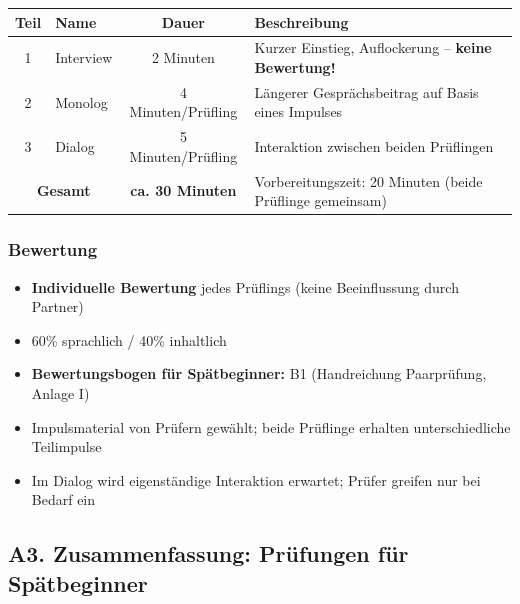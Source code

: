\documentclass[10pt,a4paper]{article}
\begin{document}
\begin{center}
\small
\begin{tabular}{|c|p{3.5cm}|c|p{6cm}|}
\hline
\rowcolor{lightgray}
\textbf{Teil} & \textbf{Name} & \textbf{Dauer} & \textbf{Beschreibung} \\
\hline
1 & Interview & 2 Minuten & Kurzer Einstieg, Auflockerung -- \textbf{keine Bewertung!} \\
\hline
2 & Monolog & 4 Minuten/Prüfling & Längerer Gesprächsbeitrag auf Basis eines Impulses \\
\hline
3 & Dialog & 5 Minuten/Prüfling & Interaktion zwischen beiden Prüflingen \\
\hline
\multicolumn{2}{|c|}{\textbf{Gesamt}} & \textbf{ca. 30 Minuten} & Vorbereitungszeit: 20 Minuten (beide Prüflinge gemeinsam) \\
\hline
\end{tabular}
\end{center}

\subsubsection{Bewertung}

\begin{itemize}[noitemsep]
\item \textbf{Individuelle Bewertung} jedes Prüflings (keine Beeinflussung durch Partner)
\item 60\% sprachlich / 40\% inhaltlich
\item \textbf{Bewertungsbogen für Spätbeginner:} B1 (Handreichung Paarprüfung, Anlage I)
\item Impulsmaterial von Prüfern gewählt; beide Prüflinge erhalten unterschiedliche Teilimpulse
\item Im Dialog wird eigenständige Interaktion erwartet; Prüfer greifen nur bei Bedarf ein
\end{itemize}

\subsection{A3. Zusammenfassung: Prüfungen für Spätbeginner}
\end{document}
